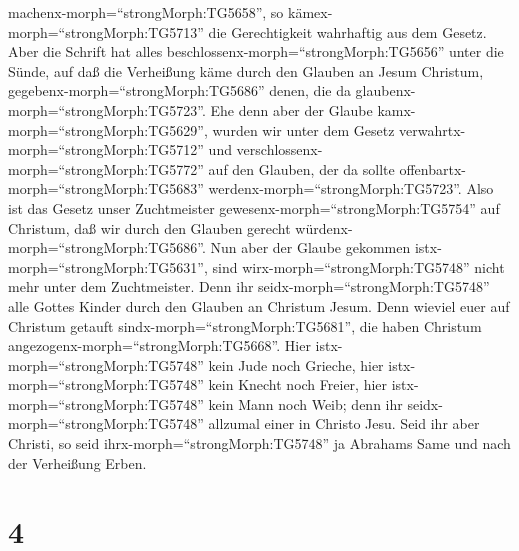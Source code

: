 machenx-morph=``strongMorph:TG5658'', so
kämex-morph=``strongMorph:TG5713'' die Gerechtigkeit wahrhaftig aus dem
Gesetz.  Aber die Schrift hat alles
beschlossenx-morph=``strongMorph:TG5656'' unter die Sünde, auf daß die
Verheißung käme durch den Glauben an Jesum Christum,
gegebenx-morph=``strongMorph:TG5686'' denen, die da
glaubenx-morph=``strongMorph:TG5723''.  Ehe denn aber der
Glaube kamx-morph=``strongMorph:TG5629'', wurden wir unter dem Gesetz
verwahrtx-morph=``strongMorph:TG5712'' und
verschlossenx-morph=``strongMorph:TG5772'' auf den Glauben, der da
sollte offenbartx-morph=``strongMorph:TG5683''
werdenx-morph=``strongMorph:TG5723''.  Also ist das Gesetz
unser Zuchtmeister gewesenx-morph=``strongMorph:TG5754'' auf Christum,
daß wir durch den Glauben gerecht würdenx-morph=``strongMorph:TG5686''.
 Nun aber der Glaube gekommen
istx-morph=``strongMorph:TG5631'', sind
wirx-morph=``strongMorph:TG5748'' nicht mehr unter dem Zuchtmeister.
 Denn ihr seidx-morph=``strongMorph:TG5748'' alle Gottes
Kinder durch den Glauben an Christum Jesum.  Denn wieviel
euer auf Christum getauft sindx-morph=``strongMorph:TG5681'', die haben
Christum angezogenx-morph=``strongMorph:TG5668''.  Hier
istx-morph=``strongMorph:TG5748'' kein Jude noch Grieche, hier
istx-morph=``strongMorph:TG5748'' kein Knecht noch Freier, hier
istx-morph=``strongMorph:TG5748'' kein Mann noch Weib; denn ihr
seidx-morph=``strongMorph:TG5748'' allzumal einer in Christo Jesu.
 Seid ihr aber Christi, so seid
ihrx-morph=``strongMorph:TG5748'' ja Abrahams Same und nach der
Verheißung Erben.

\hypertarget{section-3}{%
\section{4}\label{section-3}}

